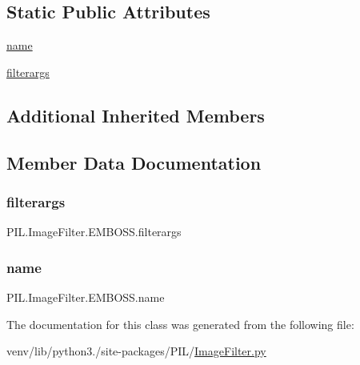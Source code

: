 \subsection*{Static Public Attributes}
\begin{DoxyCompactItemize}
\item 
\hyperlink{classPIL_1_1ImageFilter_1_1EMBOSS_aaee9f4bbbb8b1dfd013c0d87abc071cb}{name}
\item 
\hyperlink{classPIL_1_1ImageFilter_1_1EMBOSS_a99cc40222c4b3e064d8cfdf8d953e88c}{filterargs}
\end{DoxyCompactItemize}
\subsection*{Additional Inherited Members}


\subsection{Member Data Documentation}
\mbox{\label{classPIL_1_1ImageFilter_1_1EMBOSS_a99cc40222c4b3e064d8cfdf8d953e88c}} 
\subsubsection{\texorpdfstring{filterargs}{filterargs}}
{\footnotesize\ttfamily P\+I\+L.\+Image\+Filter.\+E\+M\+B\+O\+S\+S.\+filterargs\hspace{0.3cm}{\ttfamily [static]}}

\mbox{\label{classPIL_1_1ImageFilter_1_1EMBOSS_aaee9f4bbbb8b1dfd013c0d87abc071cb}} 
\subsubsection{\texorpdfstring{name}{name}}
{\footnotesize\ttfamily P\+I\+L.\+Image\+Filter.\+E\+M\+B\+O\+S\+S.\+name\hspace{0.3cm}{\ttfamily [static]}}



The documentation for this class was generated from the following file\+:\begin{DoxyCompactItemize}
\item 
venv/lib/python3./site-\/packages/\+P\+I\+L/\hyperlink{ImageFilter_8py}{Image\+Filter.\+py}\end{DoxyCompactItemize}
